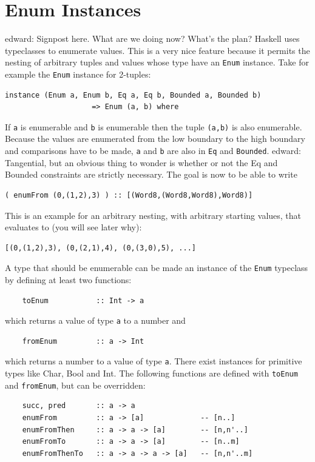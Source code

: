 \documentclass{tmr}
\newcommand{\authornote}[3]{{\color{#2} {\sc #1}: #3}}
\newcommand\bay[1]{\authornote{edward}{blue}{#1}}
\begin{document}
\section{Enum Instances}
\bay{Signpost here. What are we doing now? What's the plan?}
Haskell uses typeclasses to enumerate values. This is a very nice feature because it permits the nesting of arbitrary tuples and values whose type have an \verb|Enum| instance. Take for example the \verb|Enum| instance for 2-tuples:

\begin{Verbatim}
instance (Enum a, Enum b, Eq a, Eq b, Bounded a, Bounded b)
                    => Enum (a, b) where
\end{Verbatim}
If \verb|a| is enumerable and \verb|b| is enumerable then the tuple \verb|(a,b)| is also enumerable. Because the values are enumerated from the low boundary to the high boundary and comparisons have to be made, \verb|a| and \verb|b| are also in \verb|Eq| and \verb|Bounded|. \bay{Tangential, but an obvious thing to wonder is whether or not the Eq and Bounded constraints are strictly necessary.}
The goal is now to be able to write
\begin{Verbatim}
( enumFrom (0,(1,2),3) ) :: [(Word8,(Word8,Word8),Word8)]
\end{Verbatim}
This is an example for an arbitrary nesting, with arbitrary starting values, that evaluates to (you will see later why):
\begin{Verbatim}
[(0,(1,2),3), (0,(2,1),4), (0,(3,0),5), ...]
\end{Verbatim}


A type that should be enumerable can be made an instance of the \verb|Enum| typeclass by defining at least two functions:
\begin{Verbatim}
    toEnum           :: Int -> a
\end{Verbatim}
which returns a value of type \verb|a| to a number and
\begin{Verbatim}
    fromEnum         :: a -> Int
\end{Verbatim}
which returns a number to a value of type \verb|a|. There exist instances for primitive types like Char, Bool and Int.
The following functions are defined with \verb|toEnum| and \verb|fromEnum|, but can be overridden:

\begin{Verbatim}
    succ, pred       :: a -> a
    enumFrom         :: a -> [a]             -- [n..]
    enumFromThen     :: a -> a -> [a]        -- [n,n'..]
    enumFromTo       :: a -> a -> [a]        -- [n..m]
    enumFromThenTo   :: a -> a -> a -> [a]   -- [n,n'..m]
\end{Verbatim}
\end{document}
